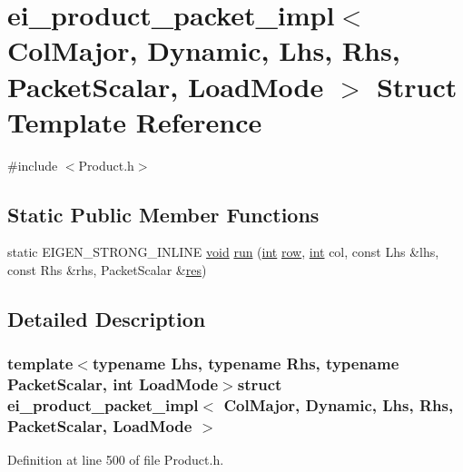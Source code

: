\hypertarget{structei__product__packet__impl_3_01_col_major_00_01_dynamic_00_01_lhs_00_01_rhs_00_01_packet_scalar_00_01_load_mode_01_4}{\section{ei\-\_\-product\-\_\-packet\-\_\-impl$<$ Col\-Major, Dynamic, Lhs, Rhs, Packet\-Scalar, Load\-Mode $>$ Struct Template Reference}
\label{structei__product__packet__impl_3_01_col_major_00_01_dynamic_00_01_lhs_00_01_rhs_00_01_packet_scalar_00_01_load_mode_01_4}
}


{\ttfamily \#include $<$Product.\-h$>$}

\subsection*{Static Public Member Functions}
\begin{DoxyCompactItemize}
\item 
static E\-I\-G\-E\-N\-\_\-\-S\-T\-R\-O\-N\-G\-\_\-\-I\-N\-L\-I\-N\-E \hyperlink{group___u_a_v_objects_plugin_ga444cf2ff3f0ecbe028adce838d373f5c}{void} \hyperlink{structei__product__packet__impl_3_01_col_major_00_01_dynamic_00_01_lhs_00_01_rhs_00_01_packet_scalar_00_01_load_mode_01_4_ab96f562413154280cae46d7b9c5cc09d}{run} (\hyperlink{ioapi_8h_a787fa3cf048117ba7123753c1e74fcd6}{int} \hyperlink{glext_8h_a11b277b422822f784ee248b43eee3e1e}{row}, \hyperlink{ioapi_8h_a787fa3cf048117ba7123753c1e74fcd6}{int} col, const Lhs \&lhs, const Rhs \&rhs, Packet\-Scalar \&\hyperlink{glext_8h_a1dbb21208b9047cc8031ca9c840d3c2f}{res})
\end{DoxyCompactItemize}


\subsection{Detailed Description}
\subsubsection*{template$<$typename Lhs, typename Rhs, typename Packet\-Scalar, int Load\-Mode$>$struct ei\-\_\-product\-\_\-packet\-\_\-impl$<$ Col\-Major, Dynamic, Lhs, Rhs, Packet\-Scalar, Load\-Mode $>$}



Definition at line 500 of file Product.\-h.



